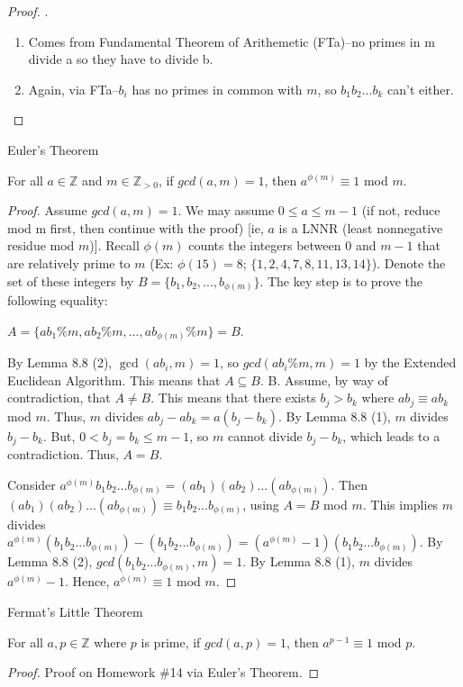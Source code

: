 \begin{proof}.
\begin{enumerate}
\item Comes from Fundamental Theorem of Arithemetic (FTa)--no primes in m divide a so they have to divide b.
\item Again, via FTa--$b_i$ has no primes in common with $m$, so $b_1b_2...b_k$ can't either.
\end{enumerate}
\end{proof}

\begin{theorem} Euler's Theorem

For all $a \in \mathbb{Z}$ and $m \in \mathbb{Z}_{>0}$, if $gcd(a,m) = 1$, then $a^{\phi(m)} \equiv 1$ mod $m$.
\end{theorem}

\begin{proof}
Assume $gcd(a,m) = 1$. We may assume $0 \leq a \leq m - 1$ (if not, reduce mod m first, then continue with the proof) [ie, $a$ is a LNNR (least nonnegative residue mod $m$)]. Recall $\phi(m)$ counts the integers between $0$ and $m - 1$ that are relatively prime to $m$ (Ex: $\phi(15) = 8$; $\{1,2,4,7,8,11,13,14\}$). Denote the set of these integers by $B = \{b_1,b_2,...,b_{\phi(m)}\}$. The key step is to prove the following equality:

\item $A = \{ab_1 \% m, ab_2 \% m,..., ab_{\phi(m)} \% m\} = B$.  

\item By Lemma 8.8 (2), $\gcd(ab_i,m) = 1$, so $gcd(ab_i \% m,m) = 1$ by the Extended Euclidean Algorithm.  This means that $A \subseteq B$. B. Assume, by way of contradiction, that $A \neq B$. This means that there exists $b_j > b_k$ where $ab_j \equiv ab_k$ mod $m$. Thus, $m$ divides $ab_j - ab_k = a(b_j - b_k)$. By Lemma 8.8 (1), $m$ divides $b_j - b_k$. But, $0 < b_j = b_k \leq m - 1$, so $m$ cannot divide $b_j - b_k$, which leads to a contradiction. Thus, $A = B$.

Consider $a^{\phi(m)}b_1b_2...b_{\phi(m)} = (ab_1)(ab_2)...(ab_{\phi(m)})$. Then $(ab_1)(ab_2)...(ab_{\phi(m)}) \equiv b_1b_2...b_{\phi(m)}$, using $A = B$ mod $m$. This implies $m$ divides $a^{\phi(m)}(b_1b_2...b_{\phi(m)}) - (b_1b_2...b_{\phi(m)}) = (a^{\phi(m)} - 1)(b_1b_2...b_{\phi(m)})$. By Lemma 8.8 (2), $gcd(b_1b_2...b_{\phi(m)},m) = 1$. By Lemma 8.8 (1), $m$ divides $a^{\phi(m)} - 1$. Hence, $a^{\phi(m)} \equiv 1$ mod $m$.

\end{proof}

\begin{theorem} Fermat's Little Theorem

For all $a,p \in \mathbb{Z}$ where $p$ is prime, if $gcd(a,p) = 1$, then $a^{p-1} \equiv 1$ mod $p$.

\end{theorem}

\begin{proof} Proof on Homework \#14 via Euler's Theorem.
\end{proof}


